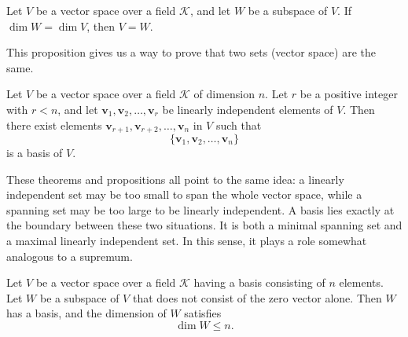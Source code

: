 \begin{propositionenv}
	Let $V$ be a vector space over a field $\mathcal{K}$, and let $W$ be a subspace of $V$.
	If $\dim W = \dim V$, then $V = W$.
\end{propositionenv}

\begin{remarkenv}
	This proposition gives us a way to prove that two sets (vector space) are the same.
\end{remarkenv}

\begin{propositionenv}
	Let $V$ be a vector space over a field $\mathcal{K}$ of dimension $n$.
	Let $r$ be a positive integer with $r < n$, and let
	$\bm{v}_1, \bm{v}_2, \dots, \bm{v}_r$ be linearly independent elements of $V$.
	Then there exist elements $\bm{v}_{r+1}, \bm{v}_{r+2}, \dots, \bm{v}_n$ in $V$ such that
	\[
	\{\bm{v}_1, \bm{v}_2, \dots, \bm{v}_n\}
	\]
	is a basis of $V$.
\end{propositionenv}

\begin{remarkenv}
    These theorems and propositions all point to the same idea: a linearly independent set may be too small to span the whole vector space, while a spanning set may be too large to be linearly independent. A basis lies exactly at the boundary between these two situations. It is both a minimal spanning set and a maximal linearly independent set. In this sense, it plays a role somewhat analogous to a supremum.
\end{remarkenv}

\begin{theoremenv}
	Let $V$ be a vector space over a field $\mathcal{K}$ having a basis consisting of $n$ elements.
	Let $W$ be a subspace of $V$ that does not consist of the zero vector alone.
	Then $W$ has a basis, and the dimension of $W$ satisfies
	\[
	\dim W \leq n.
	\]
\end{theoremenv}

\newpage